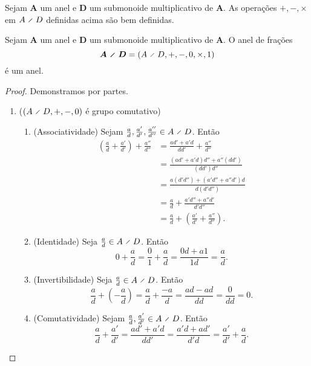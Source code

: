 \begin{exercise}
Sejam $\bm A$ um anel e $\bm D$ um submonoide multiplicativo de $\bm A$. As operações $+,-,\times$ em $A \olddiv D$ definidas acima são bem definidas.
\end{exercise}

\begin{proposition}
Sejam $\bm A$ um anel e $\bm D$ um submonoide multiplicativo de $\bm A$.  O anel de frações
	\begin{equation*}
	\bm{A \olddiv D} = (A \olddiv D,+,-,0,\times,1)
	\end{equation*}
é um anel.
\end{proposition}
\begin{proof} Demonstramos por partes.
	\begin{enumerate}
	\item ($(A \olddiv D,+,-,0)$ é grupo comutativo)
		\begin{enumerate}
		\item (Associatividade) Sejam $\frac{a}{d},\frac{a'}{d'},\frac{a''}{d''} \in A \olddiv D$. Então
			\begin{align*}
			\left( \frac{a}{d} + \frac{a'}{d'} \right) + \frac{a''}{d''} &= \frac{ad'+a'd}{dd'} + \frac{a''}{d''} \\
			&=  \frac{(ad'+a'd)d''+a''(dd')}{(dd')d''} \\
			&=  \frac{a(d'd'')+(a'd''+a''d')d}{d(d'd'')} \\
			&= \frac{a}{d} + \frac{a'd''+a''d'}{d'd''} \\
			&= \frac{a}{d} + \left( \frac{a'}{d'} + \frac{a''}{d''}  \right).
			\end{align*}

		\item (Identidade) Seja $\frac{a}{d} \in A \olddiv D$. Então
			\begin{equation*}
			0 + \frac{a}{d} = \frac{0}{1} + \frac{a}{d} = \frac{0d+a1}{1d} = \frac{a}{d}.
			\end{equation*}

		\item (Invertibilidade) Seja $\frac{a}{d} \in A \olddiv D$. Então
			\begin{equation*}
			\frac{a}{d} + (- \frac{a}{d}) = \frac{a}{d} + \frac{-a}{d} = \frac{ad-ad}{dd} = \frac{0}{dd} = 0.
			\end{equation*}

		\item (Comutatividade) Sejam $\frac{a}{d},\frac{a'}{d'} \in A \olddiv D$. Então
			\begin{equation*}
			\frac{a}{d} + \frac{a'}{d'}= \frac{ad'+a'd}{dd'} = \frac{a'd+ad'}{d'd} = \frac{a'}{d'} + \frac{a}{d}.
			\end{equation*}
		\end{enumerate}


\end{enumerate}
\end{proof}
